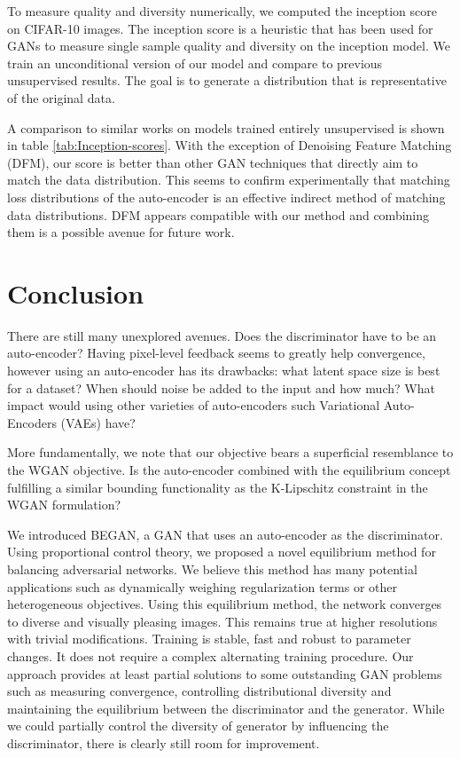 \documentclass[english]{article}
\begin{document}
To measure quality and diversity numerically, we computed the inception
score \cite{salimans2016improved} on CIFAR-10 images. The inception
score is a heuristic that has been used for GANs to measure single
sample quality and diversity on the inception model. We train an unconditional
version of our model and compare to previous unsupervised results.
The goal is to generate a distribution that is representative of the
original data.

A comparison to similar works on models trained entirely unsupervised
is shown in table \ref{tab:Inception-scores}. With the exception
of Denoising Feature Matching \cite{warde2017improving} (DFM), our
score is better than other GAN techniques that directly aim to match
the data distribution. This seems to confirm experimentally that matching
loss distributions of the auto-encoder is an effective indirect method
of matching data distributions. DFM appears compatible with our method
and combining them is a possible avenue for future work. 


\section{Conclusion}

There are still many unexplored avenues. Does the discriminator have
to be an auto-encoder? Having pixel-level feedback seems to greatly
help convergence, however using an auto-encoder has its drawbacks:
what latent space size is best for a dataset? When should noise be
added to the input and how much? What impact would using other varieties
of auto-encoders such Variational Auto-Encoders\cite{kingma2013auto_vae}
(VAEs) have?

More fundamentally, we note that our objective bears a superficial
resemblance to the WGAN \cite{arjovsky2017wasserstein} objective.
Is the auto-encoder combined with the equilibrium concept fulfilling
a similar bounding functionality as the K-Lipschitz constraint in
the WGAN formulation?

We introduced BEGAN, a GAN that uses an auto-encoder as the discriminator.
Using proportional control theory, we proposed a novel equilibrium
method for balancing adversarial networks. We believe this method
has many potential applications such as dynamically weighing regularization
terms or other heterogeneous objectives. Using this equilibrium method,
the network converges to diverse and visually pleasing images. This
remains true at higher resolutions with trivial modifications. Training
is stable, fast and robust to parameter changes. It does not require
a complex alternating training procedure. Our approach provides at
least partial solutions to some outstanding GAN problems such as measuring
convergence, controlling distributional diversity and maintaining
the equilibrium between the discriminator and the generator. While
we could partially control the diversity of generator by influencing
the discriminator, there is clearly still room for improvement.
\end{document}
